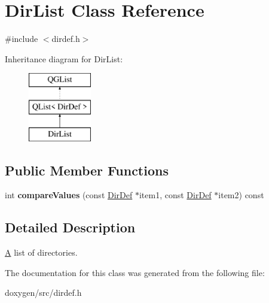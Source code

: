 \hypertarget{class_dir_list}{}\section{Dir\+List Class Reference}
\label{class_dir_list}


{\ttfamily \#include $<$dirdef.\+h$>$}

Inheritance diagram for Dir\+List\+:\begin{figure}[H]
\begin{center}
\leavevmode
\includegraphics[height=3.000000cm]{class_dir_list}
\end{center}
\end{figure}
\subsection*{Public Member Functions}
\begin{DoxyCompactItemize}
\item 
\mbox{\label{class_dir_list_a913b90e80e2b955896a39b2870accade}} 
int {\bfseries compare\+Values} (const \mbox{\hyperlink{class_dir_def}{Dir\+Def}} $\ast$item1, const \mbox{\hyperlink{class_dir_def}{Dir\+Def}} $\ast$item2) const
\end{DoxyCompactItemize}


\subsection{Detailed Description}
\mbox{\hyperlink{class_a}{A}} list of directories. 

The documentation for this class was generated from the following file\+:\begin{DoxyCompactItemize}
\item 
doxygen/src/dirdef.\+h\end{DoxyCompactItemize}
